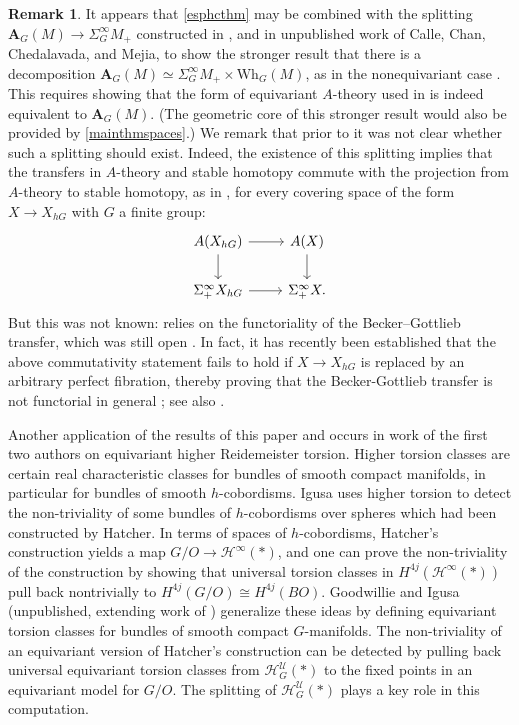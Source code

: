 \documentclass[11pt]{amsart}
\theoremstyle{definition}
\newtheorem{rem}{Remark}[section]
\numberwithin{equation}{section}
\numberwithin{figure}{section}
\newcommand{\Wh}{\mathrm{Wh}}
\newcommand{\A}{\textbf{A}}
\begin{document}
\begin{rem}
	It appears that \autoref{esphcthm} may be combined with the splitting $\A_G(M) \to \Sigma^\infty_G M_+$ constructed in \cite{hilman_ramzi}, and in unpublished work of Calle, Chan, Chedalavada, and Mejia, to show the stronger result that there is a decomposition $\A_G(M)\simeq \Sigma^\infty_G M_+ \times \Wh_G(M)$, as in the nonequivariant case \cite{wjr}. This requires showing that the form of equivariant $A$-theory used in \cite{hilman_ramzi} is indeed equivalent to $\A_G(M)$. (The geometric core of this stronger result would also be provided by \autoref{mainthmspaces}.) 
	We remark that prior to \cite{hilman_ramzi} it was not clear whether such a splitting should exist. Indeed, the existence of this splitting implies that the transfers in $A$-theory and stable homotopy commute with the projection from $A$-theory to stable homotopy, as in \cite[Thm 4.2]{raptis}, for every covering space of the form $X \to X_{hG}$ with $G$ a finite group:
	\[ \begin{tikzcd}
		A(X_{hG}) \dar \rar & A(X) \dar \\
		\Sigma^\infty_+ X_{hG} \rar & \Sigma^\infty_+ X.
	\end{tikzcd} \]
	But this was not known: \cite{raptis} relies on the functoriality of the Becker--Gottlieb transfer, which was still open \cite{klein_malkiewich_corrigendum}. In fact, it has recently been established that the above commutativity statement fails to hold if $X \to X_{hG}$ is replaced by an arbitrary perfect fibration, thereby proving that the Becker-Gottlieb transfer is not functorial in general \cite{lehner_malkiewich_naef_bg_not,naef_stoll_bg_not}; see also \cite{lind2019transfer,ccry}.
 \end{rem}

Another application of the results of this paper and \cite{GIMM1} occurs in work of the first two authors on equivariant higher Reidemeister torsion. Higher torsion classes are certain real characteristic classes for bundles of smooth compact manifolds, in particular for bundles of smooth $h$-cobordisms. Igusa \cite[Theorem 6.4.2]{igusa2002higher} uses higher torsion to detect the non-triviality of some bundles of $h$-cobordisms over spheres which had been constructed by Hatcher. In terms of spaces of $h$-cobordisms, Hatcher’s construction yields a map $G/O\to \mathcal H^\infty(\ast)$, and one can prove the non-triviality of the construction by showing that universal torsion classes in $H^{4j}(\mathcal H^\infty(\ast))$ pull back nontrivially to $H^{4j}(G/O)\cong H^{4j}(BO)$.
Goodwillie and Igusa (unpublished, extending work of \cite{goodwillie_igusa_ohrt}) generalize these ideas by defining equivariant torsion classes for bundles of smooth compact $G$-manifolds. The non-triviality of an equivariant version of Hatcher’s construction can be detected by pulling back universal equivariant torsion classes from $\mathcal H^{\mathcal U}_G(\ast)$ to the fixed points in an equivariant model for $G/O$. The splitting of $\mathcal H^{\mathcal U}_G(\ast)$ plays a key role in this computation.
\end{document}
